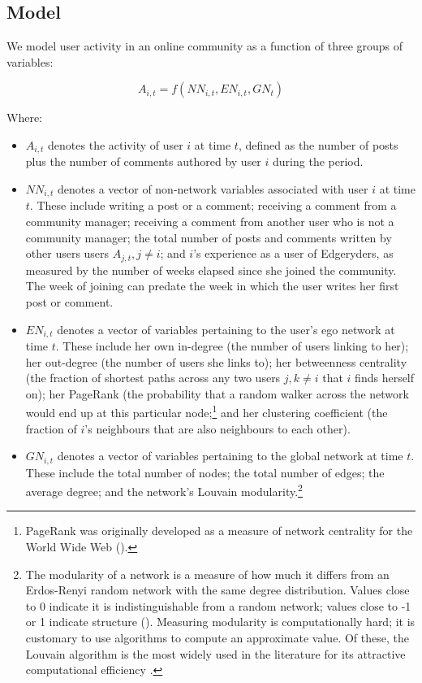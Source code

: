 \subsection{Model}

We model user activity in an online community as a function of three groups of variables:

\begin{equation}
	A_{i,t} = f(NN_{i,t}, EN_{i,t}, GN_t) 
	\label{eq:model}
\end{equation}

Where:
\begin{itemize}
\item $A_{i,t}$ denotes the activity of user $i$ at time $t$, defined as the number of posts plus the number of comments authored by user $i$ during the period.
\item $NN_{i,t}$ denotes a vector of non-network variables associated with user $i$ at time $t$. These include writing a post or a comment; receiving a comment from a community manager; receiving a comment from another user who is not a community manager; the total number of posts and comments written by other users users $A_{j,t}, j \neq i$; and $i$'s experience as a user of Edgeryders, as measured by the number of weeks elapsed since she joined the community. The week of joining can predate the week in which the user writes her first post or comment. 
\item $EN_{i, t}$ denotes a vector of variables pertaining to the user's ego network at time $t$. These include her own in-degree (the number of users linking to her); her out-degree (the number of users she links to); her betweenness centrality (the fraction of shortest paths across any two users $j,k \neq i$ that $i$ finds herself on); her PageRank (the probability that a random walker across the network would end up at this particular node;\footnote{PageRank was originally developed as a measure of network centrality for the World Wide Web (\cite{brin2012reprint}).} and her clustering coefficient (the fraction of $i$'s neighbours that are also neighbours to each other).
\item $GN_{i,t}$ denotes a vector of variables pertaining to the global network at time $t$. These include the total number of nodes; the total number of edges; the average degree; and the network's Louvain modularity.\footnote{The modularity of a network is a measure of how much it differs from an Erdos-Renyi random network with the same degree distribution. Values close to 0 indicate it is indistinguishable from a random network; values close to -1 or 1 indicate structure (\cite{clauset2004finding}). Measuring modularity is computationally hard; it is customary to use algorithms to compute an approximate value. Of these, the Louvain algorithm is the most widely used in the literature for its attractive computational efficiency \cite{blondel2008fast}.  }
\end{itemize}

